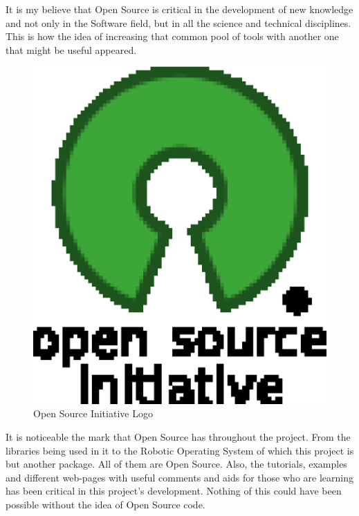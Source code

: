 It is my believe that Open Source is critical in the development of new knowledge and not only in the Software field, but in all the science and technical disciplines. This is how the idea of increasing that common pool of tools with another one that might be useful appeared. 
\\

\begin{figure}[h]
	\begin{center}
    \includegraphics[scale=0.2]{img/intro/open_source.eps}
	\caption[Open Source Initiative Logo]{Open Source Initiative Logo}
	\end{center}
\end{figure}


It is noticeable the mark that Open Source has throughout the project. From the libraries being used in it to the Robotic Operating System of which this project is but another package. All of them are Open Source. Also, the tutorials, examples and different web-pages with useful comments and aids for those who are learning has been critical in this project's development. Nothing of this could have been possible without the idea of Open Source code. 
\\

